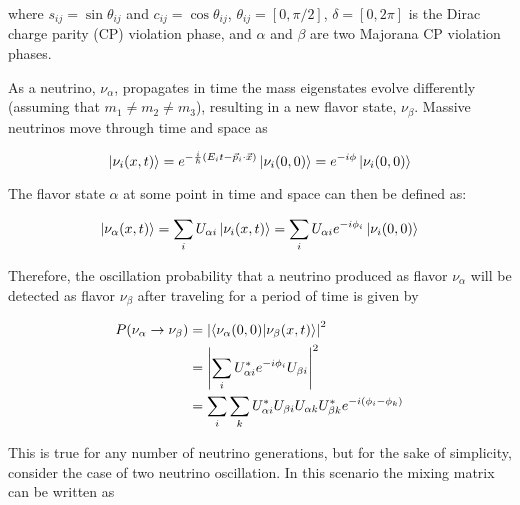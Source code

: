 \noindent where $s_{ij} = \sin\theta_{ij}$ and $c_{ij} = \cos\theta_{ij}$, $\theta_{ij} = [0,\pi/2]$,
$\delta = [0,2\pi]$ is the Dirac charge parity (CP) violation phase, and $\alpha$ and $\beta$ are two Majorana CP violation phases.

As a neutrino, $\nu_\alpha$, propagates in time the mass eigenstates evolve differently (assuming that $m_{1} \neq m_{2} \neq m_{3}$), resulting in a new flavor state, $\nu_{\beta}$.
Massive neutrinos move through time and space as

\begin{equation}
	\ket{\nu_i(x,t)} = e^{-\frac{i}{\hbar}(E_{i}t-\vec{p}_{i}\cdot\vec{x})}\ket{\nu_i(0,0)} = e^{-i\phi}\ket{\nu_i(0,0)} 
\end{equation}

\noindent The flavor state $\alpha$ at some point in time and space can then be defined as:

\begin{equation}
	\ket{\nu_{\alpha}(x,t)} = \sum_{i}U_{\alpha i}\ket{\nu_{i}(x,t)} = \sum_{i}U_{\alpha i}e^{-i\phi_{i}}\ket{\nu_{i}(0,0)}
\end{equation}

\noindent Therefore, the oscillation probability that a neutrino produced as flavor $\nu_\alpha$ will be detected as flavor $\nu_\beta$ after traveling for a period of time is given by

\begin{equation}	
\begin{split}
	P(\nu_\alpha \rightarrow \nu_\beta) &= \abs{\bra{\nu_\alpha(0,0)}\ket{\nu_\beta(x,t)}}^2 \\
	&=\abs{\sum_{i}U^{*}_{\alpha i}e^{-i\phi_i}U_{\beta i}}^2 \\
	&=\sum_{i}\sum_{k}U^{*}_{\alpha i}U_{\beta i}U_{\alpha k}U^{*}_{\beta k}e^{-i(\phi_{i}-\phi_{k})}
\end{split}
\end{equation}

This is true for any number of neutrino generations, but for the sake of simplicity, consider the case of two neutrino oscillation. In this scenario the mixing matrix can be written as 

